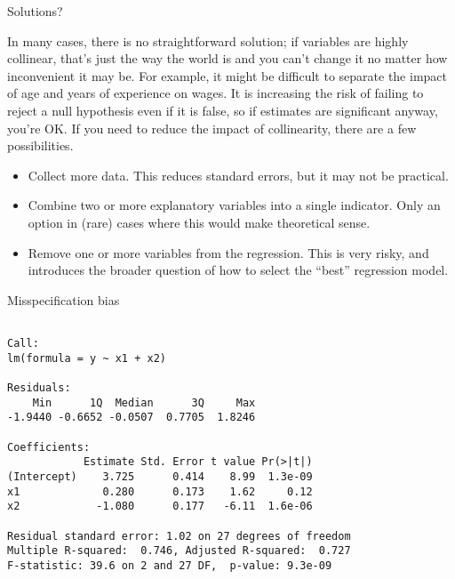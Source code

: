 \documentclass[10pt,ignorenonframetext,]{beamer}
\providecommand{\tightlist}{%
  \setlength{\itemsep}{0pt}\setlength{\parskip}{0pt}}
\begin{document}
\begin{frame}{Solutions?}

In many cases, there is no straightforward solution; if variables are
highly collinear, that's just the way the world is and you can't change
it no matter how inconvenient it may be. For example, it might be
difficult to separate the impact of age and years of experience on
wages. It is increasing the risk of failing to reject a null hypothesis
even if it is false, so if estimates are significant anyway, you're OK.
If you need to reduce the impact of collinearity, there are a few
possibilities.

\begin{itemize}
\tightlist
\item
  Collect more data. This reduces standard errors, but it may not be
  practical.
\item
  Combine two or more explanatory variables into a single indicator.
  Only an option in (rare) cases where this would make theoretical
  sense.
\item
  Remove one or more variables from the regression. This is very risky,
  and introduces the broader question of how to select the ``best''
  regression model.
\end{itemize}

\end{frame}

\begin{frame}[fragile]{Misspecification bias}

\begin{verbatim}

Call:
lm(formula = y ~ x1 + x2)

Residuals:
    Min      1Q  Median      3Q     Max 
-1.9440 -0.6652 -0.0507  0.7705  1.8246 

Coefficients:
            Estimate Std. Error t value Pr(>|t|)
(Intercept)    3.725      0.414    8.99  1.3e-09
x1             0.280      0.173    1.62     0.12
x2            -1.080      0.177   -6.11  1.6e-06

Residual standard error: 1.02 on 27 degrees of freedom
Multiple R-squared:  0.746, Adjusted R-squared:  0.727 
F-statistic: 39.6 on 2 and 27 DF,  p-value: 9.3e-09
\end{verbatim}

\end{frame}
\end{document}
